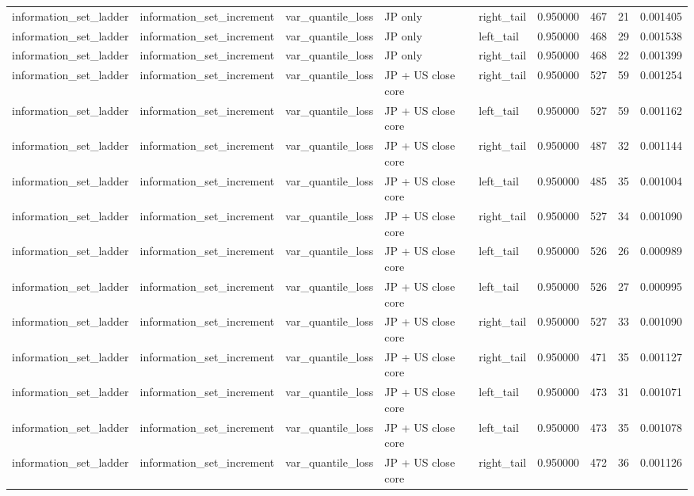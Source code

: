 \begin{tabular}{lllllrrr}
information\_set\_ladder & information\_set\_increment & var\_quantile\_loss & JP only & right\_tail & 0.950000 & 467 & 21 & 0.001405 \\
information\_set\_ladder & information\_set\_increment & var\_quantile\_loss & JP only & left\_tail & 0.950000 & 468 & 29 & 0.001538 \\
information\_set\_ladder & information\_set\_increment & var\_quantile\_loss & JP only & right\_tail & 0.950000 & 468 & 22 & 0.001399 \\
information\_set\_ladder & information\_set\_increment & var\_quantile\_loss & JP + US close core & right\_tail & 0.950000 & 527 & 59 & 0.001254 \\
information\_set\_ladder & information\_set\_increment & var\_quantile\_loss & JP + US close core & left\_tail & 0.950000 & 527 & 59 & 0.001162 \\
information\_set\_ladder & information\_set\_increment & var\_quantile\_loss & JP + US close core & right\_tail & 0.950000 & 487 & 32 & 0.001144 \\
information\_set\_ladder & information\_set\_increment & var\_quantile\_loss & JP + US close core & left\_tail & 0.950000 & 485 & 35 & 0.001004 \\
information\_set\_ladder & information\_set\_increment & var\_quantile\_loss & JP + US close core & right\_tail & 0.950000 & 527 & 34 & 0.001090 \\
information\_set\_ladder & information\_set\_increment & var\_quantile\_loss & JP + US close core & left\_tail & 0.950000 & 526 & 26 & 0.000989 \\
information\_set\_ladder & information\_set\_increment & var\_quantile\_loss & JP + US close core & left\_tail & 0.950000 & 526 & 27 & 0.000995 \\
information\_set\_ladder & information\_set\_increment & var\_quantile\_loss & JP + US close core & right\_tail & 0.950000 & 527 & 33 & 0.001090 \\
information\_set\_ladder & information\_set\_increment & var\_quantile\_loss & JP + US close core & right\_tail & 0.950000 & 471 & 35 & 0.001127 \\
information\_set\_ladder & information\_set\_increment & var\_quantile\_loss & JP + US close core & left\_tail & 0.950000 & 473 & 31 & 0.001071 \\
information\_set\_ladder & information\_set\_increment & var\_quantile\_loss & JP + US close core & left\_tail & 0.950000 & 473 & 35 & 0.001078 \\
information\_set\_ladder & information\_set\_increment & var\_quantile\_loss & JP + US close core & right\_tail & 0.950000 & 472 & 36 & 0.001126 \\

\end{tabular}

